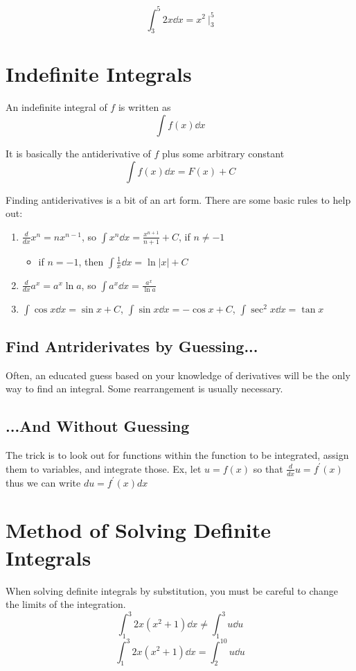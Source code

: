 \documentclass[12pt]{article}
\newcommand{\inint}[2]{\int #1 \dd #2}
\begin{document}
\[ \int_3^5 2x \dd x = x^2\ \bigg|_3^5 \]

\section*{Indefinite Integrals}
An indefinite integral of $f$ is written as \[ \inint{f(x)}{x} \]

It is basically the antiderivative of $f$ plus some arbitrary constant \[ \inint{f(x)}{x} = F(x) +C \]

Finding antiderivatives is a bit of an art form. There are some basic rules to help out:
\begin{enumerate}
\item $\frac{d}{dx}x^n = nx^{n-1}$, so $\inint{x^n}{x} = \frac{x^{n+1}}{n+1} + C$, if $n\neq -1$
\begin{itemize}
\item if $n=-1$, then $\inint{\frac{1}{x}}{x} = \ln{|x|} + C$
\end{itemize}
\item $\frac{d}{dx}a^x = a^x\ln{a}$, so $\inint{a^x}{x} = \frac{a^x}{\ln{a}}$
\item $\inint{\cos x}{x} = \sin x + C$, $\inint{\sin x}{x} = -\cos x + C$, $\inint{\sec^2 x}{x} = \tan x$
\end{enumerate}

\subsection*{Find Antriderivates by Guessing...}
Often, an educated guess based on your knowledge of derivatives will be the only way to find an integral. Some rearrangement is usually necessary.

\subsection*{...And Without Guessing}
The trick is to look out for functions within the function to be integrated, assign them to variables, and integrate those. Ex, let $u = f(x)$ so that $\frac{d}{dx}u = f^\prime(x)$ thus we can write $du = f^\prime(x)dx$

\section*{Method of Solving Definite Integrals}
When solving definite integrals by substitution, you must be careful to change the limits of the integration. \[ \int_1^3 2x(x^2+1) \dd x \neq \int_1^3 u \dd u \] \[ \int_1^3 2x(x^2+1) \dd x = \int_2^{10} u \dd u \]
\end{document}
